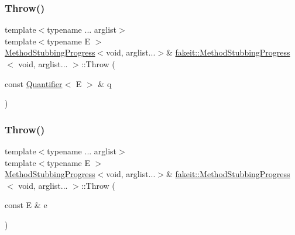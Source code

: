\mbox{\label{structfakeit_1_1MethodStubbingProgress_3_01void_00_01arglist_8_8_8_01_4_a9eb6f25dd382ef939b775345205f42c1}} 
\subsubsection{\texorpdfstring{Throw()}{Throw()}\hspace{0.1cm}{\footnotesize\ttfamily [14/27]}}
{\footnotesize\ttfamily template$<$typename ... arglist$>$ \\
template$<$typename E $>$ \\
\mbox{\hyperlink{structfakeit_1_1MethodStubbingProgress}{Method\+Stubbing\+Progress}}$<$void, arglist...$>$\& \mbox{\hyperlink{structfakeit_1_1MethodStubbingProgress}{fakeit\+::\+Method\+Stubbing\+Progress}}$<$ void, arglist... $>$\+::Throw (\begin{DoxyParamCaption}\item[{const \mbox{\hyperlink{structfakeit_1_1Quantifier}{Quantifier}}$<$ E $>$ \&}]{q }\end{DoxyParamCaption})\hspace{0.3cm}{\ttfamily [inline]}}

\mbox{\label{structfakeit_1_1MethodStubbingProgress_3_01void_00_01arglist_8_8_8_01_4_a8b0d920dc6424eadd7dce7cb9df66814}} 
\subsubsection{\texorpdfstring{Throw()}{Throw()}\hspace{0.1cm}{\footnotesize\ttfamily [15/27]}}
{\footnotesize\ttfamily template$<$typename ... arglist$>$ \\
template$<$typename E $>$ \\
\mbox{\hyperlink{structfakeit_1_1MethodStubbingProgress}{Method\+Stubbing\+Progress}}$<$void, arglist...$>$\& \mbox{\hyperlink{structfakeit_1_1MethodStubbingProgress}{fakeit\+::\+Method\+Stubbing\+Progress}}$<$ void, arglist... $>$\+::Throw (\begin{DoxyParamCaption}\item[{const E \&}]{e }\end{DoxyParamCaption})\hspace{0.3cm}{\ttfamily [inline]}}

